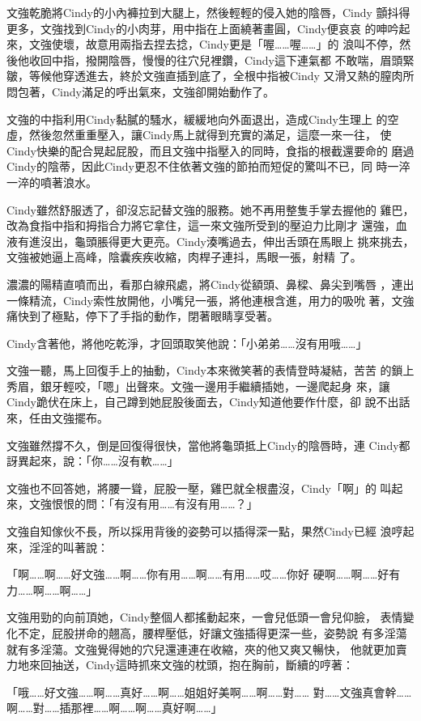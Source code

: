文強乾脆將Cindy的小內褲拉到大腿上，然後輕輕的侵入她的陰唇，Cindy
顫抖得更多，文強找到Cindy的小肉芽，用中指在上面繞著畫圓，Cindy便哀哀
的呻吟起來，文強使壞，故意用兩指去捏去捻，Cindy更是「喔……喔……」的
浪叫不停，然後他收回中指，撥開陰唇，慢慢的往穴兒裡鑽，Cindy這下連氣都
不敢喘，眉頭緊皺，等候他穿透進去，終於文強直插到底了，全根中指被Cindy
又滑又熱的膣肉所悶包著，Cindy滿足的呼出氣來，文強卻開始動作了。

文強的中指利用Cindy黏膩的騷水，緩緩地向外面退出，造成Cindy生理上
的空虛，然後忽然重重壓入，讓Cindy馬上就得到充實的滿足，這麼一來一往，
使Cindy快樂的配合晃起屁股，而且文強中指壓入的同時，食指的根截還要命的
磨過Cindy的陰蒂，因此Cindy更忍不住依著文強的節拍而短促的驚叫不已，同
時一淬一淬的噴著浪水。

Cindy雖然舒服透了，卻沒忘記替文強的服務。她不再用整隻手掌去握他的
雞巴，改為食指中指和拇指合力將它拿住，這一來文強所受到的壓迫力比剛才
還強，血液有進沒出，龜頭脹得更大更亮。Cindy湊嘴過去，伸出舌頭在馬眼上
挑來挑去，文強被她逼上高峰，陰囊疾疾收縮，肉桿子連抖，馬眼一張，射精
了。

濃濃的陽精直噴而出，看那白線飛處，將Cindy從額頭、鼻樑、鼻尖到嘴唇
，連出一條精流，Cindy索性放開他，小嘴兒一張，將他連根含進，用力的吸吮
著，文強痛快到了極點，停下了手指的動作，閉著眼睛享受著。

Cindy含著他，將他吃乾淨，才回頭取笑他說：「小弟弟……沒有用哦……」

文強一聽，馬上回復手上的抽動，Cindy本來微笑著的表情登時凝結，苦苦
的鎖上秀眉，銀牙輕咬，「嗯」出聲來。文強一邊用手繼續插她，一邊爬起身
來，讓Cindy跪伏在床上，自己蹲到她屁股後面去，Cindy知道他要作什麼，卻
說不出話來，任由文強擺布。

文強雖然撐不久，倒是回復得很快，當他將龜頭抵上Cindy的陰唇時，連
Cindy都訝異起來，說：「你……沒有軟……」

文強也不回答她，將腰一聳，屁股一壓，雞巴就全根盡沒，Cindy「啊」的
叫起來，文強恨恨的問：「有沒有用……有沒有用……？」

文強自知傢伙不長，所以採用背後的姿勢可以插得深一點，果然Cindy已經
浪哼起來，淫淫的叫著說：

「啊……啊……好文強……啊……你有用……啊……有用……哎……你好
硬啊……啊……好有力……啊……啊……」

文強用勁的向前頂她，Cindy整個人都搖動起來，一會兒低頭一會兒仰臉，
表情變化不定，屁股拼命的翹高，腰桿壓低，好讓文強插得更深一些，姿勢說
有多淫蕩就有多淫蕩。文強覺得她的穴兒還連連在收縮，夾的他又爽又暢快，
他就更加賣力地來回抽送，Cindy這時抓來文強的枕頭，抱在胸前，斷續的哼著：

「哦……好文強……啊……真好……啊……姐姐好美啊……啊……對……
對……文強真會幹……啊……對……插那裡……啊……啊……真好啊……」

